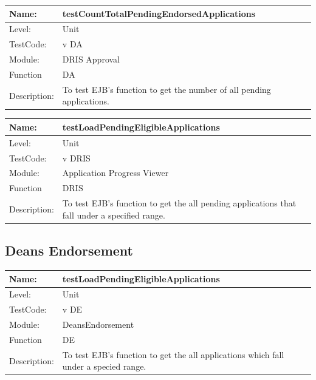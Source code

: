 \documentclass[12pt]{article}
\begin{document}
\begin{center}
\begin{tabular}{|l|p{12cm}|}
\hline

 Name: & testCountTotalPendingEndorsedApplications  \\
\hline
Level: & Unit \\
\hline
TestCode: & v DA \\
\hline
Module:& DRIS Approval \\
\hline
Function & DA \\
\hline
Description: & To test EJB's function to get the number of all pending applications. \\
\hline
\end{tabular}
\end{center}

\begin{center}
\begin{tabular}{|l|p{12cm}|}
\hline

 Name: & testLoadPendingEligibleApplications  \\
\hline
Level: & Unit \\
\hline
TestCode: & v DRIS \\
\hline
Module:& Application Progress Viewer \\
\hline
Function & DRIS \\
\hline
Description: & To test EJB's function to get the all pending applications that fall under a specified range. \\
\hline
\end{tabular}
\end{center}

\subsection{Deans Endorsement}

\begin{center}
\begin{tabular}{|l|p{12cm}|}
\hline

 Name: & testLoadPendingEligibleApplications  \\
\hline
Level: & Unit \\
\hline
TestCode: & v DE \\
\hline
Module:& DeansEndorsement \\
\hline
Function & DE \\
\hline
Description: & To test EJB's function to get the all applications which fall under a specied range. \\
\hline
\end{tabular}
\end{center}
\end{document}
